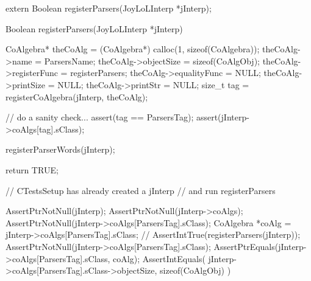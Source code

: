 \startTestSuite[registerParsers]

\startCHeader
extern Boolean registerParsers(JoyLoLInterp *jInterp);
\stopCHeader
{}

\startCCode
Boolean registerParsers(JoyLoLInterp *jInterp) {
  CoAlgebra* theCoAlg    = (CoAlgebra*) calloc(1, sizeof(CoAlgebra));
  theCoAlg->name         = ParsersName;
  theCoAlg->objectSize   = sizeof(CoAlgObj);
  theCoAlg->registerFunc = registerParsers;
  theCoAlg->equalityFunc = NULL;
  theCoAlg->printSize    = NULL;
  theCoAlg->printStr     = NULL;
  size_t tag = registerCoAlgebra(jInterp, theCoAlg);
  
  // do a sanity check...
  assert(tag == ParsersTag);
  assert(jInterp->coAlgs[tag].sClass);
  
  registerParserWords(jInterp);
    
  return TRUE;
}
\stopCCode


\startCTest
  // CTestsSetup has already created a jInterp
  // and run registerParsers
  
  AssertPtrNotNull(jInterp);
  AssertPtrNotNull(jInterp->coAlgs);
  AssertPtrNotNull(jInterp->coAlgs[ParsersTag].sClass);
  CoAlgebra *coAlg = jInterp->coAlgs[ParsersTag].sClass;
//  AssertIntTrue(registerParsers(jInterp));
  AssertPtrNotNull(jInterp->coAlgs[ParsersTag].sClass);
  AssertPtrEquals(jInterp->coAlgs[ParsersTag].sClass, coAlg);
  AssertIntEquals(
    jInterp->coAlgs[ParsersTag].sClass->objectSize,
    sizeof(CoAlgObj)
  )
\stopCTest
\stopTestCase
\stopTestSuite

